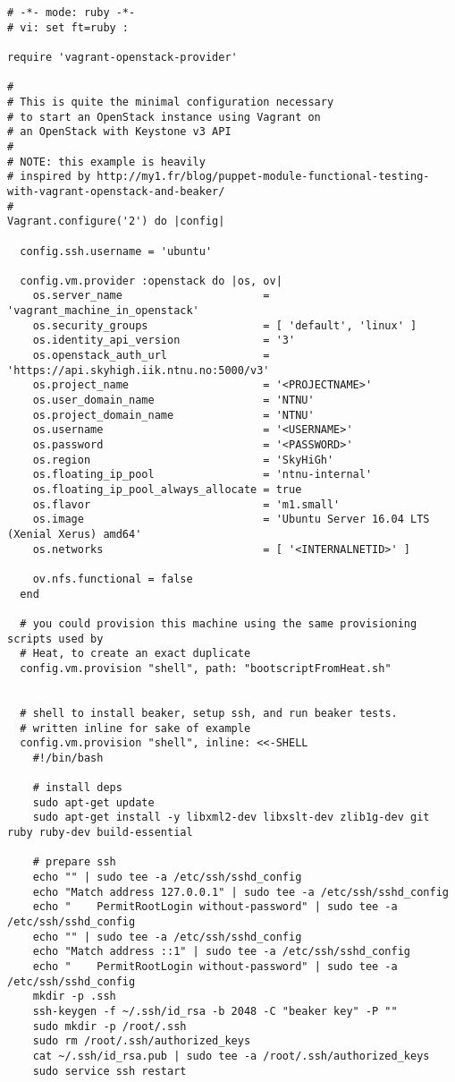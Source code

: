 \begin{verbatim}
# -*- mode: ruby -*-
# vi: set ft=ruby :

require 'vagrant-openstack-provider'

#
# This is quite the minimal configuration necessary
# to start an OpenStack instance using Vagrant on
# an OpenStack with Keystone v3 API
#
# NOTE: this example is heavily
# inspired by http://my1.fr/blog/puppet-module-functional-testing-with-vagrant-openstack-and-beaker/
#
Vagrant.configure('2') do |config|

  config.ssh.username = 'ubuntu'

  config.vm.provider :openstack do |os, ov|
    os.server_name                      = 'vagrant_machine_in_openstack'
    os.security_groups                  = [ 'default', 'linux' ]
    os.identity_api_version             = '3'
    os.openstack_auth_url               = 'https://api.skyhigh.iik.ntnu.no:5000/v3'
    os.project_name                     = '<PROJECTNAME>'
    os.user_domain_name                 = 'NTNU'
    os.project_domain_name              = 'NTNU'
    os.username                         = '<USERNAME>'
    os.password                         = '<PASSWORD>'
    os.region                           = 'SkyHiGh'
    os.floating_ip_pool                 = 'ntnu-internal'
    os.floating_ip_pool_always_allocate = true
    os.flavor                           = 'm1.small'
    os.image                            = 'Ubuntu Server 16.04 LTS (Xenial Xerus) amd64'
    os.networks                         = [ '<INTERNALNETID>' ]

    ov.nfs.functional = false
  end

  # you could provision this machine using the same provisioning scripts used by 
  # Heat, to create an exact duplicate
  config.vm.provision "shell", path: "bootscriptFromHeat.sh"
  

  # shell to install beaker, setup ssh, and run beaker tests.
  # written inline for sake of example
  config.vm.provision "shell", inline: <<-SHELL
    #!/bin/bash

    # install deps
    sudo apt-get update
    sudo apt-get install -y libxml2-dev libxslt-dev zlib1g-dev git ruby ruby-dev build-essential

    # prepare ssh
    echo "" | sudo tee -a /etc/ssh/sshd_config
    echo "Match address 127.0.0.1" | sudo tee -a /etc/ssh/sshd_config
    echo "    PermitRootLogin without-password" | sudo tee -a /etc/ssh/sshd_config
    echo "" | sudo tee -a /etc/ssh/sshd_config
    echo "Match address ::1" | sudo tee -a /etc/ssh/sshd_config
    echo "    PermitRootLogin without-password" | sudo tee -a /etc/ssh/sshd_config
    mkdir -p .ssh
    ssh-keygen -f ~/.ssh/id_rsa -b 2048 -C "beaker key" -P ""
    sudo mkdir -p /root/.ssh
    sudo rm /root/.ssh/authorized_keys
    cat ~/.ssh/id_rsa.pub | sudo tee -a /root/.ssh/authorized_keys
    sudo service ssh restart
   

\end{verbatim}

